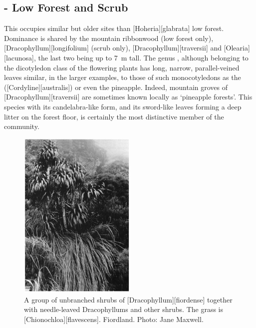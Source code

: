 \subsection[\emph{Dracophyllum}-\emph{Olearia} Low Forest and Scrub]{- Low Forest and Scrub}

This occupies similar but older sites than [Hoheria][glabrata] low forest.
Dominance is shared by the mountain ribbonwood (low forest only), [Dracophyllum][longifolium] (scrub only), [Dracophyllum][traversii] and [Olearia][lacunosa], the last two being up to \SI{7}{\metre} tall.
The genus , although belonging to the dicotyledon class of the flowering plants has long, narrow, parallel-veined leaves similar, in the larger examples, to those of such monocotyledons as the  ([Cordyline][australis]) or even the pineapple.
Indeed, mountain groves of [Dracophyllum][traversii] are sometimes known locally as `pineapple forests'.
This species with its candelabra-like form, and its sword-like leaves forming a deep litter on the forest floor, is certainly the most distinctive member of the community.

\begin{figure}
	\includegraphics[width=0.5\textwidth]{graphics/figure92dracophyllum.jpg}
	\centering
	\caption[A group of unbranched shrubs of \emph{Dracophyllum fiordense}]{A group of unbranched shrubs of [Dracophyllum][fiordense] together with needle-leaved Dracophyllums and other shrubs.
	The grass is [Chionochloa][flavescens].
	Fiordland.
	Photo: Jane Maxwell.}%
	\label{fig:92dracophyllum}
\end{figure}

